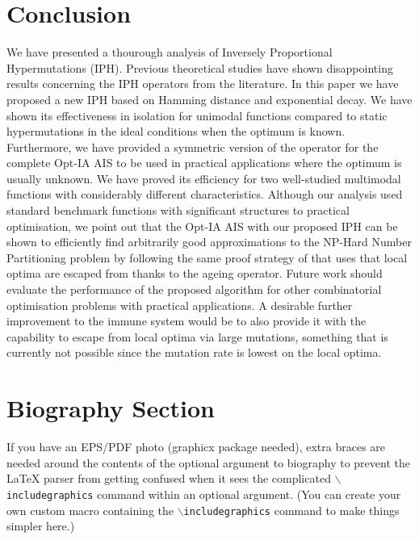 \documentclass[lettersize,journal]{IEEEtran}
\begin{document}
\section{Conclusion}
We have presented a thourough analysis of Inversely Proportional Hypermutations (IPH).
Previous theoretical studies have shown disappointing results concerning the IPH operators from the literature.
In this paper we have proposed a new IPH based on Hamming distance and exponential decay.
We have shown its effectiveness in isolation for unimodal functions compared to static hypermutations in the ideal conditions when the optimum is known.
Furthermore, we have provided a symmetric version of the operator for the complete Opt-IA AIS to be used in practical applications where the optimum is usually unknown.
We have proved its efficiency for two well-studied multimodal functions with considerably different characteristics.
Although our analysis used standard benchmark functions with significant structures to practical optimisation, we point out that the Opt-IA AIS with our proposed IPH can be shown to efficiently find arbitrarily good approximations to the NP-Hard Number Partitioning problem by following the same proof strategy of \cite{CorusOlivetoYazdaniAIJ2019} that uses that local optima are escaped from thanks to the ageing operator.
Future work should evaluate the performance of the proposed algorithm for other combinatorial optimisation problems with practical applications. A desirable further improvement to the immune system would be to also provide it with the capability to escape from local optima via large mutations, something that is currently not possible since the mutation rate is lowest on the local optima.





%

\newpage

\section{Biography Section}
If you have an EPS/PDF photo (graphicx package needed), extra braces are
 needed around the contents of the optional argument to biography to prevent
 the LaTeX parser from getting confused when it sees the complicated
 $\backslash${\tt{includegraphics}} command within an optional argument. (You can create
 your own custom macro containing the $\backslash${\tt{includegraphics}} command to make things
 simpler here.)
 
\end{document}
